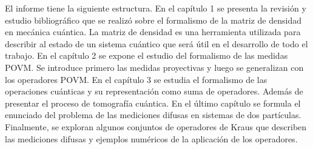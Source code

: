 
El informe tiene la siguiente estructura.  En el capítulo 1 se presenta la
revisión y estudio bibliográfico que se realizó sobre el formalismo de la
matriz de densidad en mecánica cuántica. La matriz de densidad es una
herramienta utilizada para describir al estado de un sistema cuántico que será
útil en el desarrollo de todo el trabajo. En el capítulo 2 se expone el estudio
del formalismo de las medidas POVM\@. Se introduce primero las medidas
proyectivas y luego se generalizan con los operadores POVM\@. En el capítulo 3
se estudia el formalismo de las operaciones cuánticas y su representación como
suma de operadores. Además de presentar el proceso de tomografía cuántica. En
el último capítulo se formula el enunciado del problema de las mediciones
difusas en sistemas de dos partículas. Finalmente, se exploran algunos
conjuntos de operadores de Kraus que describen las mediciones difusas y
ejemplos numéricos de la aplicación de los operadores. 


